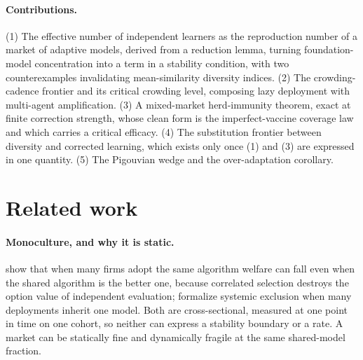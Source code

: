 \documentclass{article}
\theoremstyle{plain}
\theoremstyle{definition}
\begin{document}
\paragraph{Contributions.}
(1) The effective number of independent learners as the reproduction number of a market of adaptive models, derived from a reduction lemma, turning foundation-model concentration into a term in a stability condition, with two counterexamples invalidating mean-similarity diversity indices. (2) The crowding-cadence frontier and its critical crowding level, composing lazy deployment with multi-agent amplification. (3) A mixed-market herd-immunity theorem, exact at finite correction strength, whose clean form is the imperfect-vaccine coverage law and which carries a critical efficacy. (4) The substitution frontier between diversity and corrected learning, which exists only once (1) and (3) are expressed in one quantity. (5) The Pigouvian wedge and the over-adaptation corollary.

\section{Related work}

\paragraph{Monoculture, and why it is static.}
\citet{kleinberg2021} show that when many firms adopt the same algorithm welfare can fall even when the shared algorithm is the better one, because correlated selection destroys the option value of independent evaluation; \citet{bommasani2022} formalize systemic exclusion when many deployments inherit one model. Both are cross-sectional, measured at one point in time on one cohort, so neither can express a stability boundary or a rate. A market can be statically fine and dynamically fragile at the same shared-model fraction.
\end{document}
